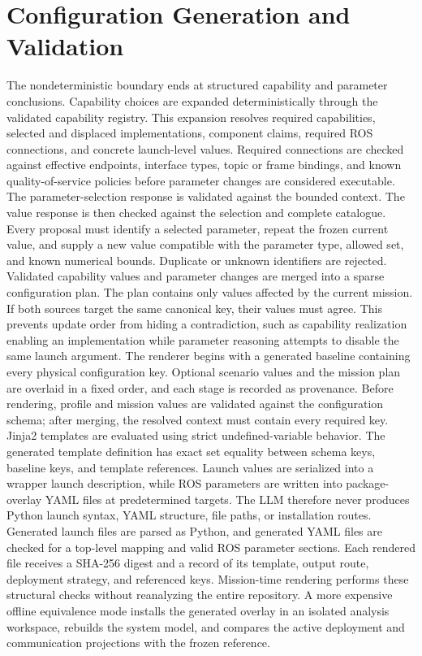 \section{Configuration Generation and Validation}
\label{sec:config-gen-validation}
The nondeterministic boundary ends at structured capability and parameter conclusions. Capability choices are expanded deterministically through the validated capability registry. This expansion resolves required capabilities, selected and displaced implementations, component claims, required ROS connections, and concrete launch-level values. Required connections are checked against effective endpoints, interface types, topic or frame bindings, and known quality-of-service policies before parameter changes are considered executable.
The parameter-selection response is validated against the bounded context. The value response is then checked against the selection and complete catalogue. Every proposal must identify a selected parameter, repeat the frozen current value, and supply a new value compatible with the parameter type, allowed set, and known numerical bounds. Duplicate or unknown identifiers are rejected.
Validated capability values and parameter changes are merged into a sparse configuration plan. The plan contains only values affected by the current mission. If both sources target the same canonical key, their values must agree. This prevents update order from hiding a contradiction, such as capability realization enabling an implementation while parameter reasoning attempts to disable the same launch argument.
The renderer begins with a generated baseline containing every physical configuration key. Optional scenario values and the mission plan are overlaid in a fixed order, and each stage is recorded as provenance. Before rendering, profile and mission values are validated against the configuration schema; after merging, the resolved context must contain every required key.
Jinja2 templates are evaluated using strict undefined-variable behavior. The generated template definition has exact set equality between schema keys, baseline keys, and template references. Launch values are serialized into a wrapper launch description, while ROS parameters are written into package-overlay YAML files at predetermined targets. The LLM therefore never produces Python launch syntax, YAML structure, file paths, or installation routes.
Generated launch files are parsed as Python, and generated YAML files are checked for a top-level mapping and valid ROS parameter sections. Each rendered file receives a SHA-256 digest and a record of its template, output route, deployment strategy, and referenced keys. Mission-time rendering performs these structural checks without reanalyzing the entire repository. A more expensive offline equivalence mode installs the generated overlay in an isolated analysis workspace, rebuilds the system model, and compares the active deployment and communication projections with the frozen reference.

